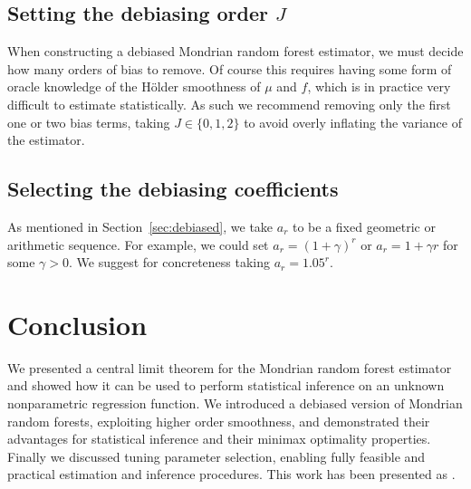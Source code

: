 \subsection{Setting the debiasing order \texorpdfstring{$J$}{J}}%

When constructing a debiased Mondrian random forest estimator,
we must decide how many orders of bias to remove.
Of course this requires having some form of oracle knowledge of the
H{\"o}lder smoothness of $\mu$ and $f$,
which is in practice very difficult to estimate statistically.
As such we recommend removing only the first one or two
bias terms, taking $J \in \{0,1,2\}$
to avoid overly inflating the variance of the estimator.

\subsection{Selecting the debiasing coefficients}%

As mentioned in Section~\ref{sec:debiased},
we take $a_r$ to be a fixed geometric or arithmetic sequence.
For example, we could set
$a_r = (1+\gamma)^r$
or $a_r = 1 + \gamma r$ for some $\gamma > 0$.
We suggest for concreteness taking $a_r = 1.05^r$.

\section{Conclusion}%
\label{sec:mondrian_conclusion}

We presented a central limit theorem for the Mondrian random forest
estimator and showed how it can be used to perform statistical inference
on an unknown nonparametric regression function.
We introduced a debiased version of Mondrian random forests, exploiting higher
order smoothness, and
demonstrated their advantages for statistical inference and their
minimax optimality properties.
Finally we discussed tuning parameter selection, enabling fully
feasible and practical estimation and inference procedures.
This work has been presented as
%
\cite{%
  underwood2024talkmichigan,%
  underwood2024talkillinois,%
  underwood2024talkpitt%
}.
